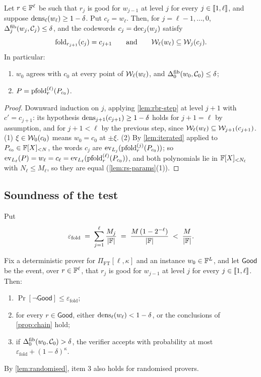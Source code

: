 \begin{proposition}\label{prop:chain}
Let $r \in \mathbb{F}^\ell$ be such that $r_j$ is good for $w_{j-1}$ at level $j$ for every $j \in \llbracket 1, \ell \rrbracket$, and suppose $\mathrm{dens}_\ell(w_\ell) \ge 1-\delta$.
Put $c_\ell = w_\ell$. Then, for $j = \ell-1, \dots, 0$, $\Delta^{\mathrm{fib}}_j(w_j, \mathcal{C}_j) \le \delta$, and the codewords $c_j = \mathrm{dec}_j(w_j)$ satisfy
\[
  \mathrm{fold}_{r_{j+1}}(c_j) = c_{j+1}
  \qquad\text{and}\qquad
  \mathcal{W}_\ell(w_\ell) \subseteq \mathcal{W}_{j}(c_j).
\]
In particular:
\begin{enumerate}
  \item $w_0$ agrees with $c_0$ at every point of $\mathcal{W}_\ell(w_\ell)$, and $\Delta^{\mathrm{fib}}_0(w_0, \mathcal{C}_0) \le \delta$;
  \item $P = \mathrm{pfold}^{(\ell)}_r(P_{c_0})$.
\end{enumerate}
\end{proposition}

\begin{proof}
Downward induction on $j$, applying \cref{lem:rbr-step} at level $j+1$ with $c' = c_{j+1}$: its hypothesis $\mathrm{dens}_{j+1}(c_{j+1}) \ge 1-\delta$ holds for $j+1 = \ell$ by assumption, and for $j+1 < \ell$ by the previous step, since $\mathcal{W}_\ell(w_\ell) \subseteq \mathcal{W}_{j+1}(c_{j+1})$.
(1) $\xi \in \mathcal{W}_0(c_0)$ means $w_0 = c_0$ at $\pm\xi$.
(2) By \cref{lem:iterated} applied to $P_{c_0} \in \mathbb{F}[X]_{<N}$, the words $c_j$ are $\mathrm{ev}_{L_j}(\mathrm{pfold}^{(j)}_r(P_{c_0}))$; so $\mathrm{ev}_{L_\ell}(P) = w_\ell = c_\ell = \mathrm{ev}_{L_\ell}(\mathrm{pfold}^{(\ell)}_r(P_{c_0}))$, and both polynomials lie in $\mathbb{F}[X]_{<N_\ell}$ with $N_\ell \le M_\ell$, so they are equal (\cref{lem:rs-params}(1)).
\end{proof}

\subsection{Soundness of the test}\label{sec:fold:sound}

Put
\[
  \varepsilon_{\mathrm{fold}} \;=\; \sum_{j=1}^{\ell} \frac{M_j}{|\mathbb{F}|} \;=\; \frac{M\,(1 - 2^{-\ell})}{|\mathbb{F}|} \;<\; \frac{M}{|\mathbb{F}|}.
\]

\begin{theorem}\label{thm:fpt}
Fix a deterministic prover for $\Pi_{\mathrm{FT}}[\ell,\kappa]$ and an instance $w_0 \in \mathbb{F}^{L}$, and let $\mathsf{Good}$ be the event, over $r \in \mathbb{F}^\ell$, that $r_j$ is good for $w_{j-1}$ at level $j$ for every $j \in \llbracket 1, \ell \rrbracket$. Then:
\begin{enumerate}
  \item $\Pr[\neg\mathsf{Good}] \le \varepsilon_{\mathrm{fold}}$;
  \item for every $r \in \mathsf{Good}$, either $\mathrm{dens}_\ell(w_\ell) < 1-\delta$, or the conclusions of \cref{prop:chain} hold;
  \item if $\Delta^{\mathrm{fib}}_0(w_0, \mathcal{C}_0) > \delta$, the verifier accepts with probability at most $\varepsilon_{\mathrm{fold}} + (1-\delta)^\kappa$.
\end{enumerate}
By \cref{lem:randomised}, item 3 also holds for randomised provers.
\end{theorem}

